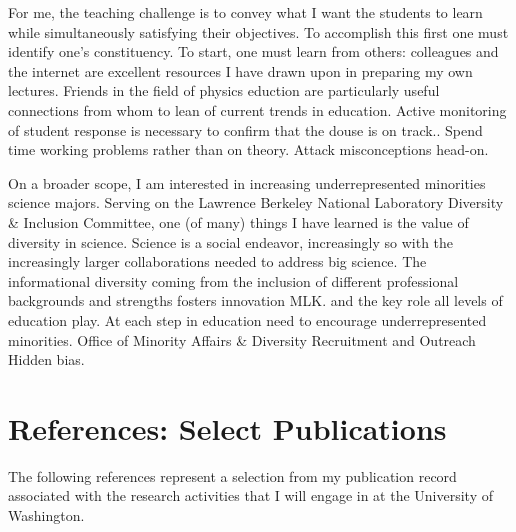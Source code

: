\documentclass{article}
\begin{document}
For me, the teaching challenge is to convey what I want the students to learn while simultaneously
satisfying their objectives.  %
To accomplish this first one must identify one's constituency. 
To start, one must learn from others:
colleagues and the internet are excellent resources I have drawn upon in preparing
my own lectures.  Friends in the field of physics eduction are particularly useful connections from
whom to lean of current  trends in education.  Active monitoring of student response is necessary
to confirm that the douse is on track..
Spend time working problems rather than on theory.
Attack misconceptions head-on.


On a broader scope, I am interested in increasing underrepresented minorities science majors.
Serving on the Lawrence Berkeley National Laboratory Diversity \& Inclusion Committee, one (of many) things I have
learned is the value of diversity in science.  Science is a social endeavor, increasingly so with
the increasingly larger collaborations needed to address big science.  The informational diversity
coming  from the inclusion of different professional backgrounds and strengths fosters innovation
MLK.
 and the key role all levels of education play.  At each step
in education need to encourage underrepresented minorities.
Office of Minority Affairs \& Diversity Recruitment and Outreach
Hidden bias.



\section{References: Select Publications}
The following references represent a selection from my publication record associated with the research
activities that I will engage in at the University of Washington.



\end{document}
